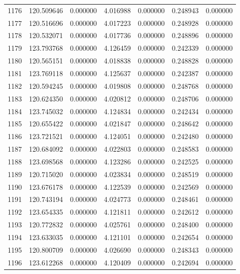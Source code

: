 \begin{tabular}{rrrrrrr}
1176 & 120.509646 &    0.000000 &  4.016988 &   0.000000 &   0.248943 &  0.000000 \\
1177 & 120.516696 &    0.000000 &  4.017223 &   0.000000 &   0.248928 &  0.000000 \\
1178 & 120.532071 &    0.000000 &  4.017736 &   0.000000 &   0.248896 &  0.000000 \\
1179 & 123.793768 &    0.000000 &  4.126459 &   0.000000 &   0.242339 &  0.000000 \\
1180 & 120.565151 &    0.000000 &  4.018838 &   0.000000 &   0.248828 &  0.000000 \\
1181 & 123.769118 &    0.000000 &  4.125637 &   0.000000 &   0.242387 &  0.000000 \\
1182 & 120.594245 &    0.000000 &  4.019808 &   0.000000 &   0.248768 &  0.000000 \\
1183 & 120.624350 &    0.000000 &  4.020812 &   0.000000 &   0.248706 &  0.000000 \\
1184 & 123.745032 &    0.000000 &  4.124834 &   0.000000 &   0.242434 &  0.000000 \\
1185 & 120.655422 &    0.000000 &  4.021847 &   0.000000 &   0.248642 &  0.000000 \\
1186 & 123.721521 &    0.000000 &  4.124051 &   0.000000 &   0.242480 &  0.000000 \\
1187 & 120.684092 &    0.000000 &  4.022803 &   0.000000 &   0.248583 &  0.000000 \\
1188 & 123.698568 &    0.000000 &  4.123286 &   0.000000 &   0.242525 &  0.000000 \\
1189 & 120.715020 &    0.000000 &  4.023834 &   0.000000 &   0.248519 &  0.000000 \\
1190 & 123.676178 &    0.000000 &  4.122539 &   0.000000 &   0.242569 &  0.000000 \\
1191 & 120.743194 &    0.000000 &  4.024773 &   0.000000 &   0.248461 &  0.000000 \\
1192 & 123.654335 &    0.000000 &  4.121811 &   0.000000 &   0.242612 &  0.000000 \\
1193 & 120.772832 &    0.000000 &  4.025761 &   0.000000 &   0.248400 &  0.000000 \\
1194 & 123.633035 &    0.000000 &  4.121101 &   0.000000 &   0.242654 &  0.000000 \\
1195 & 120.800709 &    0.000000 &  4.026690 &   0.000000 &   0.248343 &  0.000000 \\
1196 & 123.612268 &    0.000000 &  4.120409 &   0.000000 &   0.242694 &  0.000000 \\

\end{tabular}
